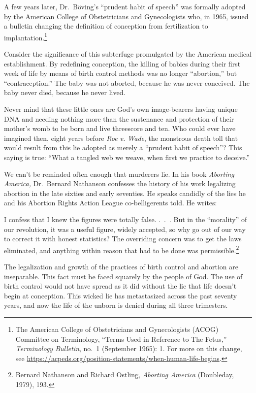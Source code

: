 \documentclass[
]{book}
\begin{document}
A few years later, Dr.~Böving's ``prudent habit of speech'' was formally adopted by the American College of Obstetricians and Gynecologists who, in 1965, issued a bulletin changing the definition of conception from fertilization to implantation.\footnote{The American College of Obstetricians and Gynecologists (ACOG) Committee on Terminology, ``Terms Used in Reference to The Fetus,'' \emph{Terminology Bulletin}, no.~1 (September 1965): 1. For more on this change, see \url{https://acpeds.org/position-statements/when-human-life-begins}.}

Consider the significance of this subterfuge promulgated by the American medical establishment. By redefining conception, the killing of babies during their first week of life by means of birth control methods was no longer ``abortion,'' but ``contraception.'' The baby was not aborted, because he was never conceived. The baby never died, because he never lived.

Never mind that these little ones are God's own image-bearers having unique DNA and needing nothing more than the sustenance and protection of their mother's womb to be born and live threescore and ten. Who could ever have imagined then, eight years before \emph{Roe v. Wade}, the monstrous death toll that would result from this lie adopted as merely a ``prudent habit of speech''? This saying is true: ``What a tangled web we weave, when first we practice to deceive.''

We can't be reminded often enough that murderers lie. In his book \emph{Aborting America,} Dr.~Bernard Nathanson confesses the history of his work legalizing abortion in the late sixties and early seventies. He speaks candidly of the lies he and his Abortion Rights Action League co-belligerents told. He writes:

I confess that I knew the figures were totally false. .~.~. But in the ``morality'' of our revolution, it was a useful figure, widely accepted, so why go out of our way to correct it with honest statistics? The overriding concern was to get the laws eliminated, and anything within reason that had to be done was permissible.\footnote{Bernard Nathanson and Richard Ostling, \emph{Aborting America} (Doubleday, 1979), 193.}

The legalization and growth of the practices of birth control and abortion are inseparable. This fact must be faced squarely by the people of God. The use of birth control would not have spread as it did without the lie that life doesn't begin at conception. This wicked lie has metastasized across the past seventy years, and now the life of the unborn is denied during all three trimesters.
\end{document}
